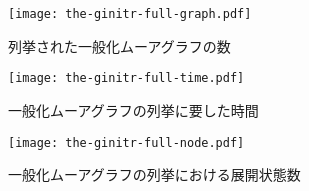 \begin{figure}
  \centering
  \texttt{[image: the-ginitr-full-graph.pdf]}
  \caption{列挙された一般化ムーアグラフの数}
  \label{fig:ginitr-full-graph}
\end{figure}
\begin{figure}
  \centering
  \texttt{[image: the-ginitr-full-time.pdf]}
  \caption{一般化ムーアグラフの列挙に要した時間}
  \label{fig:ginitr-full-time}
\end{figure}
\begin{figure}
  \centering
  \texttt{[image: the-ginitr-full-node.pdf]}
  \caption{一般化ムーアグラフの列挙における展開状態数}
  \label{fig:ginitr-full-node}
\end{figure}
